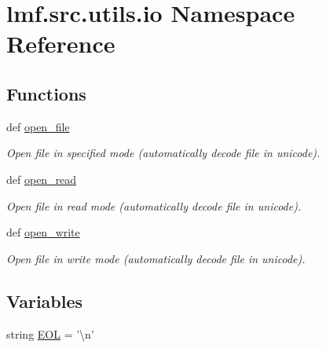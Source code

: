 \hypertarget{namespacelmf_1_1src_1_1utils_1_1io}{\section{lmf.\+src.\+utils.\+io Namespace Reference}
\label{namespacelmf_1_1src_1_1utils_1_1io}
}
\subsection*{Functions}
\begin{DoxyCompactItemize}
\item 
def \hyperlink{namespacelmf_1_1src_1_1utils_1_1io_a3cfd9f0e0184883c64f87bab4686befc}{open\+\_\+file}
\begin{DoxyCompactList}\small\item\em Open file in specified mode (automatically decode file in unicode). \end{DoxyCompactList}\item 
def \hyperlink{namespacelmf_1_1src_1_1utils_1_1io_a2659ffc6cd260a7a4e43f0546d518dff}{open\+\_\+read}
\begin{DoxyCompactList}\small\item\em Open file in read mode (automatically decode file in unicode). \end{DoxyCompactList}\item 
def \hyperlink{namespacelmf_1_1src_1_1utils_1_1io_a943b893b8992a6e46d91400538709b80}{open\+\_\+write}
\begin{DoxyCompactList}\small\item\em Open file in write mode (automatically decode file in unicode). \end{DoxyCompactList}\end{DoxyCompactItemize}
\subsection*{Variables}
\begin{DoxyCompactItemize}
\item 
string \hyperlink{namespacelmf_1_1src_1_1utils_1_1io_aba483c0f0c8e8321ce08e15fe8b8092a}{E\+O\+L} = '\textbackslash{}n'
\end{DoxyCompactItemize}


